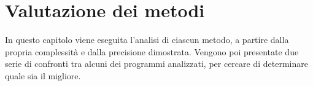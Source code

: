 \documentclass[crop=false, class=book]{standalone}
\begin{document}
	
	\chapter{Valutazione dei metodi}
	In questo capitolo viene eseguita l'analisi di ciascun metodo, a partire dalla propria complessità e dalla precisione dimostrata. Vengono poi presentate due serie di confronti tra alcuni dei programmi analizzati, per cercare di determinare quale sia il migliore.
	
	
\end{document}
